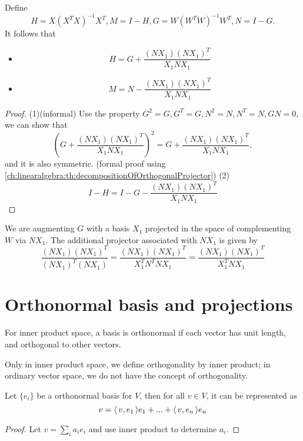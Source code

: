 \begin{refsection}
\begin{corollary}
Define $$H = X(X^TX)^{-1}X^T, M = I - H,  G = W(W^TW)^{-1}W^T, N = I - G.$$
It follows that
\begin{itemize}
	\item $$H = G + \frac{(NX_1)(NX_1)^T}{X_1NX_1}$$
	\item $$M = N - \frac{(NX_1)(NX_1)^T}{X_1NX_1}$$
\end{itemize}
\end{corollary}
\begin{proof}
(1)(informal) Use the property $G^2 = G, G^T = G, N^2 = N, N^T = N, GN = 0$, we can show that
$$(G + \frac{(NX_1)(NX_1)^T}{X_1NX_1})^2 = G + \frac{(NX_1)(NX_1)^T}{X_1NX_1},$$ 
and it is also symmetric.
(formal proof using \autoref{ch:linearalgebra:th:decompositionOfOrthogonalProjector})
(2) $$I - H = I - G -  \frac{(NX_1)(NX_1)^T}{X_1NX_1}$$
\end{proof}

\begin{remark}[interpretation]
We are augmenting $G$ with a basis $X_1$ projected in the space of complementing $W$ via $NX_1$. 
The additional projector associated with $NX_1$ is given by 
$$\frac{(NX_1)(NX_1)^T}{(NX_1)^T(NX_1)} = \frac{(NX_1)(NX_1)^T}{X^T_1N^TNX_1} = \frac{(NX_1)(NX_1)^T}{X^T_1NX_1}$$	
\end{remark}


\section{Orthonormal basis and projections}
\begin{definition}
For inner product space, a basis is orthonormal if each vector has unit length, and orthogonal to other vectors. 
\end{definition}
\begin{remark}
Only in inner product space, we define orthogonality by inner product; in ordinary vector space, we do not have the concept of orthogonality.
\end{remark}


\begin{lemma}
Let $\{e_i\}$ be a orthonormal basis for $V$, then for all $v \in V$, it can be represented as
$$v = {\left< \, v,e_1 \, \right>}e_1 + ... +{\left< \, v,e_n \, \right>}e_n$$
\end{lemma}
\begin{proof}
	Let $v=\sum_i a_i e_i$ and use inner product to determine $a_i$.
\end{proof}





\end{refsection}
